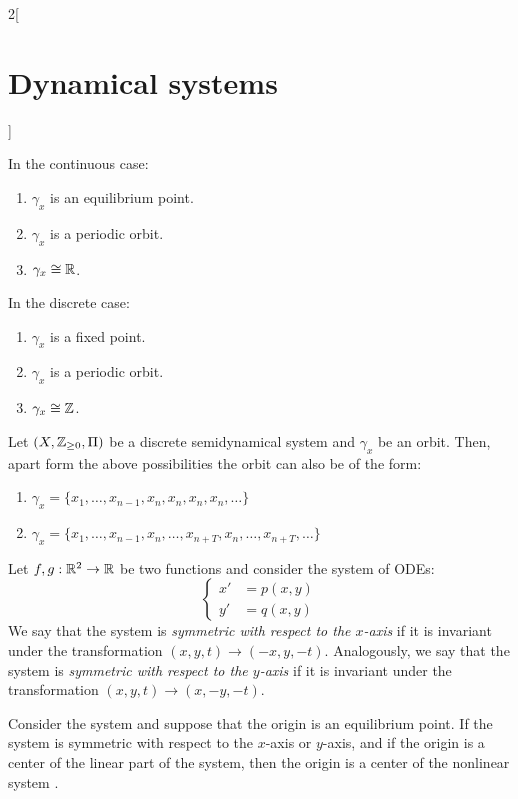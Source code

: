 \documentclass[../../../main_math.tex]{subfiles}
\begin{document}
\begin{multicols}{2}[\section{Dynamical systems}]
\begin{theorem}
    In the continuous case:
    \begin{enumerate}
      \item $\gamma_x$ is an equilibrium point.
      \item $\gamma_x$ is a periodic orbit.
      \item $\gamma_x\cong\mathbb{R}$.
    \end{enumerate}
    In the discrete case:
    \begin{enumerate}
      \item $\gamma_x$ is a fixed point.
      \item $\gamma_x$ is a periodic orbit.
      \item $\gamma_x\cong\mathbb{Z}$.
    \end{enumerate}
  \end{theorem}
  \begin{theorem}
    Let $(X,\mathbb{Z}_{\geq 0},\Pi)$ be a discrete semidynamical system and $\gamma_x$ be an orbit. Then, apart form the above possibilities the orbit can also be of the form:
    \begin{enumerate}
      \item $\gamma_x=\{x_1,\ldots,x_{n-1},x_n,x_n,x_n,x_n,\ldots\}$
      \item $\gamma_x=\{x_1,\ldots,x_{n-1},x_n,\ldots,x_{n+T},x_n,\ldots,x_{n+T},\ldots\}$
    \end{enumerate}
  \end{theorem}
  \begin{definition}
    Let $f,g:\mathbb{R}^2\rightarrow\mathbb{R}$ be two functions and consider the system of ODEs:
    \begin{equation}\label{DS:plane}
      \left\{
      \begin{aligned}
        x' & =p(x,y) \\
        y' & =q(x,y)
      \end{aligned}
      \right.
    \end{equation}
    We say that the system is \emph{symmetric with respect to the $x$-axis} if it is invariant under the transformation $(x,y,t)\rightarrow(-x,y,-t)$. Analogously, we say that the system is \emph{symmetric with respect to the $y$-axis} if it is invariant under the transformation $(x,y,t)\rightarrow(x,-y,-t)$.
  \end{definition}
  \begin{theorem}
    Consider the system  and suppose that the origin is an equilibrium point. If the system is symmetric with respect to the $x$-axis or $y$-axis, and if the origin is a center of the linear part of the system, then the origin is a center of the nonlinear system .

\end{theorem}
\end{multicols}
\end{document}

